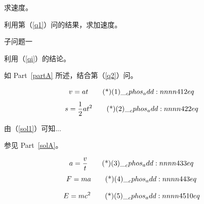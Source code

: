 \documentclass[answer]{cphos}
\begin{document}
\begin{problem}[20]{}

\begin{problemstatement}
\label{partA}

\label{q1} 求速度。

\label{q2} 利用第（\ref{q1}）问的结果，求加速度。

\label{qi} 子问题一

\label{qii} 利用（\ref{qi}）的结论。

\label{partB}

\label{qB1} 如 Part~\ref{partA} 所述，结合第（\ref{q2}）问。
\end{problemstatement}

\begin{solution}
\label{solA}

\label{sol1}
\begin{equation}
    v = at \eqtagscore{1}{2}
\end{equation}
\begin{equation}
    s = \frac{1}{2}at^2 \eqtagscore{2}{2}
\end{equation}

\label{sol2}
由（\ref{sol1}）可知...

参见 Part~\ref{solA}。

\begin{equation}
    a = \frac{v}{t} \eqtagscore{3}{3}
\end{equation}
\begin{equation}
    F = ma \eqtagscore{4}{3}
\end{equation}

\begin{equation}
    E = mc^2 \eqtagscore{5}{10}
\end{equation}

\scoring
\end{solution}
\end{problem}
\end{document}
